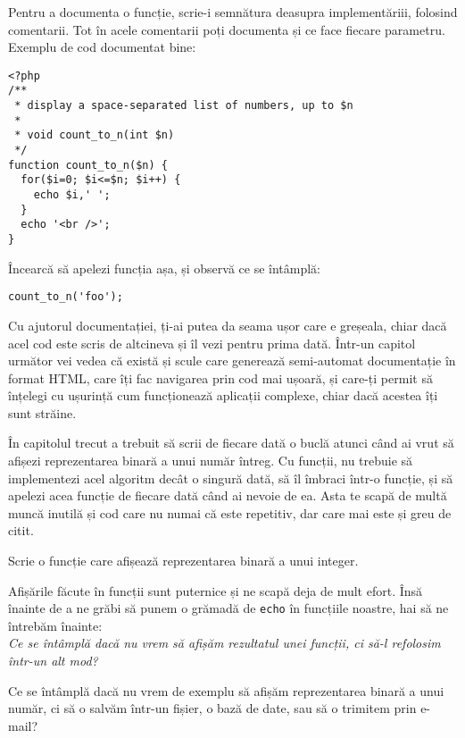Pentru a documenta o funcție, scrie-i semnătura deasupra implementăriii,
folosind comentarii. Tot în acele comentarii poți documenta și
ce face fiecare parametru. Exemplu de cod documentat bine:

\begin{lstlisting}
<?php
/**
 * display a space-separated list of numbers, up to $n
 *
 * void count_to_n(int $n)
 */
function count_to_n($n) {
  for($i=0; $i<=$n; $i++) {
	echo $i,' ';
  }
  echo '<br />';
}
\end{lstlisting}

Încearcă să apelezi funcția așa, și observă
ce se întâmplă:
\begin{lstlisting}
count_to_n('foo');
\end{lstlisting}

Cu ajutorul documentației, ți-ai putea da seama ușor care e greșeala,
chiar dacă acel cod este scris de altcineva și îl vezi pentru prima dată.
Într-un capitol următor vei vedea că există și scule care generează semi-automat
documentație în format HTML, care îți fac navigarea prin cod mai ușoară, 
și care-ți permit să înțelegi cu ușurință cum funcționează aplicații
complexe, chiar dacă acestea îți sunt străine.

\begin{Exercise}[title={Funcție care afișează reprezentarea binară}]
În capitolul trecut a trebuit să scrii de fiecare
dată o buclă atunci când ai vrut să afișezi reprezentarea
binară a unui număr întreg. Cu funcții, nu trebuie
să implementezi acel algoritm decât o singură dată,
să îl {\glqq}îmbraci{\grqq} într-o funcție, și să apelezi acea
funcție de fiecare dată când ai nevoie de ea. Asta te scapă de
multă muncă inutilă și cod care nu numai că este repetitiv,
dar care mai este și greu de citit.

Scrie o funcție care afișează reprezentarea binară a unui integer.
\end{Exercise}

Afișările făcute în funcții sunt puternice și ne scapă deja de mult
efort. Însă înainte de a ne grăbi să punem o grămadă de \texttt{echo}
în funcțiile noastre, hai să ne întrebăm înainte:\\
\textit{Ce se întâmplă dacă nu vrem să afișăm rezultatul unei funcții, ci să-l
refolosim într-un alt mod?}

Ce se întâmplă dacă nu vrem de exemplu să afișăm reprezentarea binară
a unui număr, ci să o salvăm într-un fișier, o bază de date, sau să
o trimitem prin e-mail?

